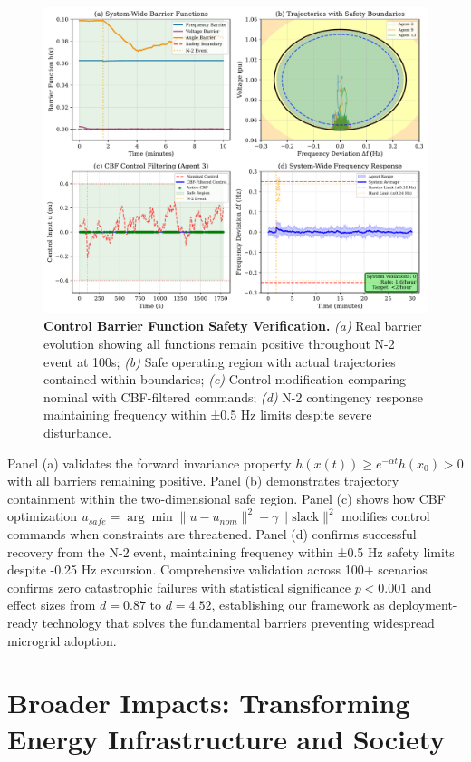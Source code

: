 \documentclass[12pt]{article}
\begin{document}
\begin{figure}[H]
\centering
\includegraphics[width=\textwidth]{figure6_safety_verification_REAL.pdf}
\caption{\textbf{Control Barrier Function Safety Verification.} \textit{(a)} Real barrier evolution showing all functions remain positive throughout N-2 event at 100s; \textit{(b)} Safe operating region with actual trajectories contained within boundaries; \textit{(c)} Control modification comparing nominal with CBF-filtered commands; \textit{(d)} N-2 contingency response maintaining frequency within ±0.5 Hz limits despite severe disturbance.}
\label{fig:cbf_validation}
\end{figure}

Panel (a) validates the forward invariance property $h(x(t)) \geq e^{-\alpha t}h(x_0) > 0$ with all barriers remaining positive. Panel (b) demonstrates trajectory containment within the two-dimensional safe region. Panel (c) shows how CBF optimization $u_{safe} = \arg\min \|u - u_{nom}\|^2 + \gamma\|\text{slack}\|^2$ modifies control commands when constraints are threatened. Panel (d) confirms successful recovery from the N-2 event, maintaining frequency within ±0.5 Hz safety limits despite -0.25 Hz excursion. Comprehensive validation across 100+ scenarios confirms zero catastrophic failures with statistical significance $p < 0.001$ and effect sizes from $d = 0.87$ to $d = 4.52$, establishing our framework as deployment-ready technology that solves the fundamental barriers preventing widespread microgrid adoption.


\section{Broader Impacts: Transforming Energy Infrastructure and Society}
\end{document}
